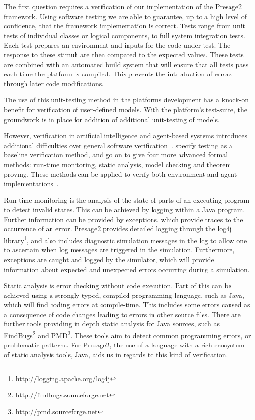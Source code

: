 The first question requires a verification of our implementation of the Presage2
framework. Using software testing we are able to guarantee, up to a high level of
confidence, that the framework implementation is correct. Tests range from unit
tests of individual classes or logical components, to full system integration
tests. Each test prepares an environment and inputs for the code under test. The
response to these stimuli are then compared to the expected values. These tests
are combined with an automated build system that will ensure that all tests pass
each time the platform is compiled. This prevents the introduction of errors
through later code modifications.

The use of this unit-testing method in the platforms development has a knock-on
benefit for verification of user-defined models. With the platform's test-suite,
the groundwork is in place for addition of additional unit-testing of models.

However, verification in artificial intelligence and agent-based systems
introduces additional difficulties over general software
verification~\citep{Wooldridge1998}. \citet{Menzies2005} specify testing as a
baseline verification method, and go on to give four more advanced formal
methods: run-time monitoring, static analysis, model checking and theorem
proving. These methods can be applied to verify both environment and agent
implementations~\citep{Sudeikat2007a}.

Run-time monitoring is the analysis of the state of parts of an executing
program to detect invalid states. This can be achieved by logging within a
Java program. Further information can be provided by exceptions, which provide
traces to the occurrence of an error. Presage2 provides detailed logging through
the log4j library\footnote{http://logging.apache.org/log4j}, and also includes diagnostic simulation messages in the log
to allow one to ascertain when log messages are triggered in the simulation.
Furthermore, exceptions are caught and logged by the simulator, which will
provide information about expected and unexpected errors occurring during a
simulation.

Static analysis is error checking without code execution. Part of this can be
achieved using a strongly typed, compiled programming language, such as Java,
which will find coding errors at compile-time. This includes some errors
caused as a consequence of code changes leading to errors in other source
files. There are further tools providing in depth static analysis for Java
sources, such as FindBugs\footnote{http://findbugs.sourceforge.net} and
PMD\footnote{http://pmd.sourceforge.net}. These tools aim to detect common
programming errors, or problematic patterns. For Presage2, the use of a
language with a rich ecosystem of static analysis tools, Java, aids us in
regards to this kind of verification.

